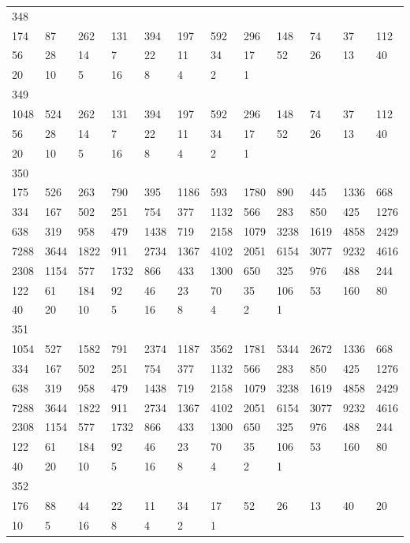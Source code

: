 \begin{longtable}{llllllllllll}
348&&&&&&&&&&&\\
174& 87& 262& 131& 394& 197& 592& 296& 148& 74& 37& 112\\
56& 28& 14& 7& 22& 11& 34& 17& 52& 26& 13& 40\\
20& 10& 5& 16& 8& 4& 2& 1& \\

349&&&&&&&&&&&\\
1048& 524& 262& 131& 394& 197& 592& 296& 148& 74& 37& 112\\
56& 28& 14& 7& 22& 11& 34& 17& 52& 26& 13& 40\\
20& 10& 5& 16& 8& 4& 2& 1& \\

350&&&&&&&&&&&\\
175& 526& 263& 790& 395& 1186& 593& 1780& 890& 445& 1336& 668\\
334& 167& 502& 251& 754& 377& 1132& 566& 283& 850& 425& 1276\\
638& 319& 958& 479& 1438& 719& 2158& 1079& 3238& 1619& 4858& 2429\\
7288& 3644& 1822& 911& 2734& 1367& 4102& 2051& 6154& 3077& 9232& 4616\\
2308& 1154& 577& 1732& 866& 433& 1300& 650& 325& 976& 488& 244\\
122& 61& 184& 92& 46& 23& 70& 35& 106& 53& 160& 80\\
40& 20& 10& 5& 16& 8& 4& 2& 1& \\

351&&&&&&&&&&&\\
1054& 527& 1582& 791& 2374& 1187& 3562& 1781& 5344& 2672& 1336& 668\\
334& 167& 502& 251& 754& 377& 1132& 566& 283& 850& 425& 1276\\
638& 319& 958& 479& 1438& 719& 2158& 1079& 3238& 1619& 4858& 2429\\
7288& 3644& 1822& 911& 2734& 1367& 4102& 2051& 6154& 3077& 9232& 4616\\
2308& 1154& 577& 1732& 866& 433& 1300& 650& 325& 976& 488& 244\\
122& 61& 184& 92& 46& 23& 70& 35& 106& 53& 160& 80\\
40& 20& 10& 5& 16& 8& 4& 2& 1& \\

352&&&&&&&&&&&\\
176& 88& 44& 22& 11& 34& 17& 52& 26& 13& 40& 20\\
10& 5& 16& 8& 4& 2& 1& \\


\end{longtable}
